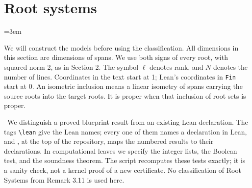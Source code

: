 \section{Root systems}\label{sec:3}
\begingroup
\emergencystretch=3em

We will construct the models before using the classification. All dimensions in this
section are dimensions of spans. We use both signs of every root, with squared norm 2,
as in Section 2. The symbol $\ell$ denotes rank, and $N$ denotes the number of lines.
Coordinates in the text start at 1; Lean's coordinates in \texttt{Fin} start at 0.
An isometric inclusion means a linear isometry of spans carrying the source roots
into the target roots. It is proper when that inclusion of root sets is proper.

\new\ We distinguish a proved blueprint result from an existing Lean declaration.
The tags \verb|\lean| give the Lean names; every one of them names a declaration in
Lean, and , at the top of the repository, maps the numbered results
to their declarations. In
computational leaves we specify the integer lists, the Boolean test, and the soundness theorem.
The script  recomputes these tests exactly; it is a
sanity check, not a kernel proof of a new certificate.
No classification of Root Systems from Remark 3.11 is used here.

